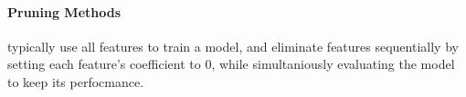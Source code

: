 \paragraph{Pruning Methods}
\label{par:methods.flat.embedded.pruning}

  
typically use all features to train a model,
and eliminate features sequentially by setting each feature's coefficient to
$0$, while simultaniously evaluating the model to keep its perfocmance.

